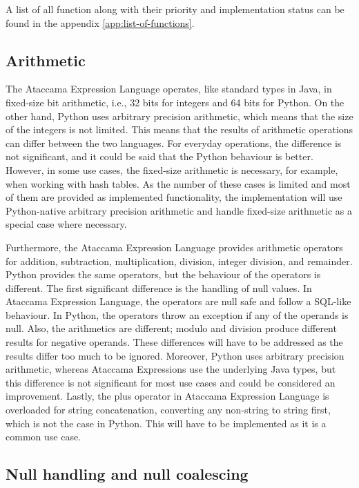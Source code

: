 A list of all function along with their priority and implementation status can be found in the appendix \ref{app:list-of-functions}.


\subsection{Arithmetic}
The Ataccama Expression Language operates, like standard types in Java, in
fixed-size bit arithmetic, i.e., 32 bits for integers and 64 bits for Python. 
On the other hand, Python uses arbitrary precision arithmetic, which means that the size
of the integers is not limited. This means that the results of arithmetic operations
can differ between the two languages.
For everyday operations, the difference is not significant, and it could be said
that the Python behaviour is better. However, in some use cases, the fixed-size
arithmetic is necessary, for example, when working with hash tables. As the number
of these cases is limited and most of them are provided as implemented functionality,
the implementation will use Python-native arbitrary precision arithmetic and
handle fixed-size arithmetic as a special case where necessary.

Furthermore, the Ataccama Expression Language provides arithmetic operators
for addition, subtraction, multiplication, division, integer division, and remainder. 
Python provides the same operators, but
the behaviour of the operators is different. The first significant difference
is the handling of null values. In Ataccama Expression Language, the operators are null safe and
follow a SQL-like behaviour. In Python, the operators throw an exception if any of the operands is null.
Also, the arithmetics are different; modulo and division produce different results for negative operands. These differences will have to be addressed as the
results differ too much to be ignored.  Moreover, Python uses arbitrary precision arithmetic, whereas Ataccama Expressions use the underlying Java types, but this difference is not significant for most use cases and could be considered an improvement. 
Lastly, the plus operator in Ataccama Expression Language is overloaded for string concatenation, converting any non-string to string first, which is not the case in Python. This will have to be implemented as it is a common use case.


\subsection{Null handling and null coalescing}

